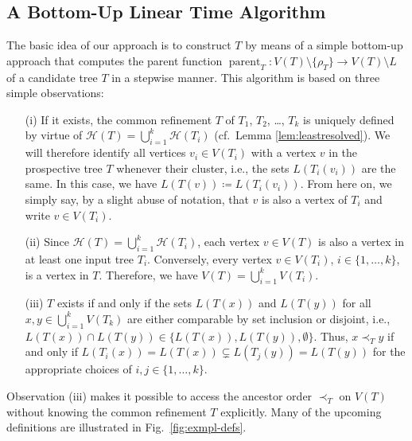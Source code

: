 \documentclass[11pt]{article}
\newcommand{\parent}{\operatorname{parent}}
\newcommand{\HH}{\mathcal{H}}
\begin{document}
\subsection*{A Bottom-Up Linear Time Algorithm}

The basic idea of our approach is to construct $T$ by means of a
simple bottom-up approach that computes the parent function
$\parent_T:V(T)\setminus\{\rho_T\}\to V(T)\setminus L$ of a candidate
tree $T$ in a stepwise manner. This algorithm is based on three simple
observations:
\begin{itemize}
  \item[(i)] If it exists, the common refinement $T$ of $T_1$, $T_2$, \dots,
  $T_k$ is uniquely defined by virtue of $\HH(T)=\bigcup_{i=1}^k \HH(T_i)$
  (cf.\ Lemma \ref{lem:leastresolved}). We will therefore identify all
  vertices $v_i\in V(T_i)$ with a vertex $v$ in the prospective tree $T$
  whenever their cluster, i.e., the sets $L(T_i(v_i))$ are the same. In
  this case, we have $L(T(v))\coloneqq L(T_i(v_i))$.  From here on, we
  simply say, by a slight abuse of notation, that $v$ is also a vertex of
  $T_i$ and write $v\in V(T_i)$.
  \item[(ii)] Since $\HH(T)=\bigcup_{i=1}^k \HH(T_i)$, each vertex
  $v\in V(T)$ is also a vertex in at least one input tree $T_i$.
  Conversely, every vertex $v\in V(T_i)$, $i\in\{1,\dots,k\}$, is a vertex
  in $T$. Therefore, we have $V(T)=\bigcup_{i=1}^k V(T_i)$.
  \item[(iii)] $T$ exists if and only if the sets $L(T(x))$ and $L(T(y))$ for
  all $x,y\in \bigcup_{i=1}^k V(T_k)$ are either comparable by set
  inclusion or disjoint, i.e.,
  $L(T(x))\cap L(T(y))\in\{L(T(x)),L(T(y)),\emptyset\}$.  Thus,
  $x \prec_T y$ if and only if
  $L(T_i(x))=L(T(x)) \subsetneq L(T_j(y))=L(T(y))$ for the appropriate
  choices of $i,j\in\{1,\dots, k\}$.
\end{itemize} Observation (iii) makes it possible to access the ancestor
order $\prec_T$ on $V(T)$ without knowing the common refinement $T$
explicitly.  Many of the upcoming definitions are illustrated in
Fig.~\ref{fig:exmpl-defs}.
\end{document}
